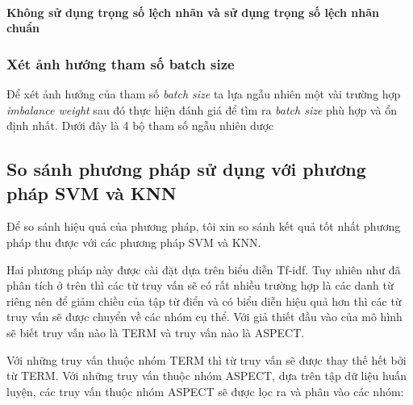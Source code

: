 \documentclass[fontsize=12pt]{scrartcl}
\begin{document}
\paragraph*{Không sử dụng trọng số lệch nhãn và sử dụng trọng số lệch nhãn chuẩn}

\subsubsection{Xét ảnh hướng tham số batch size}
Để xét ảnh hưởng của tham số \textit{batch size} ta lựa ngẫu nhiên một vài trường hợp \textit{imbalance weight} sau đó thực hiện đánh giá để tìm ra \textit{batch size} phù hợp và ổn định nhất.
Dưới đây là 4 bộ tham số ngẫu nhiên dược
\subsection{So sánh phương pháp sử dụng với phương pháp SVM và KNN}
\par
Để so sánh hiệu quả của phương pháp, tôi xin so sánh kết quả tốt nhất phương pháp thu được với các phương pháp SVM và KNN.
\par
Hai phương pháp này được cài đặt dựa trên biểu diễn Tf-idf. Tuy nhiên như đã phân tích ở trên thì các từ truy vấn sẽ có rất nhiều trường hợp là các danh từ riêng nên để giảm chiều của tập từ điển và có biểu diễn hiệu quả hơn thì các từ truy vấn sẽ được chuyển về các nhóm cụ thể. Với giả thiết đầu vào của mô hình sẽ biết truy vấn nào là TERM và truy vấn nào là ASPECT.
\par
Với những truy vấn thuộc nhóm TERM thì từ truy vấn sẽ được thay thế hết bởi từ TERM. Với những truy vấn thuộc nhóm ASPECT, dựa trên tập dữ liệu huấn luyện, các truy vấn thuộc nhóm ASPECT sẽ được lọc ra và phân vào các nhóm:
\end{document}
